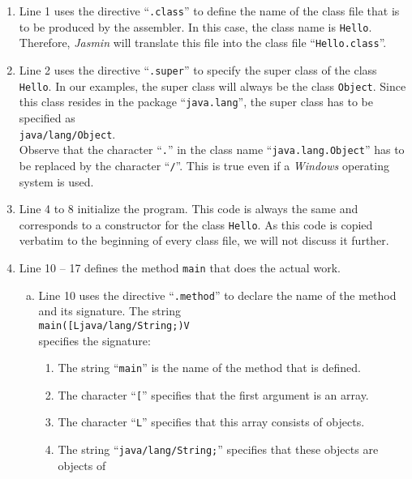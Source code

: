 \begin{enumerate}
\item Line 1 uses the directive ``\texttt{.class}'' to define the name of the class file that is to
      be produced by the assembler.  
      In this case, the class name is \texttt{Hello}.  Therefore, \textsl{Jasmin} will translate
      this file into the class file ``\texttt{Hello.class}''.
\item Line 2 uses the directive ``\texttt{.super}'' to specify the super class of the class
      \texttt{Hello}.  In our examples, the super class will always be the class \texttt{Object}.
      Since this class resides in the package ``\texttt{java.lang}'', the super class has to be
      specified as 
      \\[0.2cm]
      \hspace*{1.3cm}
      \texttt{java/lang/Object}.
      \\[0.2cm]
      Observe that the character ``\texttt{.}'' in the class name ``\texttt{java.lang.Object}''
      has to be replaced by the character ``\texttt{/}''.  This is true even if a \textsl{Windows}
      operating system is used.
\item Line 4 to 8 initialize the program.  This code is always the same and corresponds to a
      constructor for the class \texttt{Hello}.  As this code is copied verbatim to the beginning 
      of every class file, we will not discuss it further. 
\item Line 10 -- 17 defines the method \texttt{main} that does the actual work.
  \begin{enumerate}[(a)]
  \item Line 10 uses the directive ``\texttt{.method}'' to declare the name of the method and its
        signature.  The string 
        \\[0.2cm]
        \hspace*{1.3cm}
        \texttt{main([Ljava/lang/String;)V}
        \\[0.2cm]
        specifies the signature:
        \begin{enumerate}
        \item The string ``\texttt{main}''  is the name of the method that is defined.
        \item The character ``\texttt{[}'' specifies that the first argument is an array.
        \item The character ``\texttt{L}'' specifies that this array consists of objects.
        \item The string ``\texttt{java/lang/String;}'' specifies that these objects are objects of

\end{enumerate}
\end{enumerate}
\end{enumerate}
